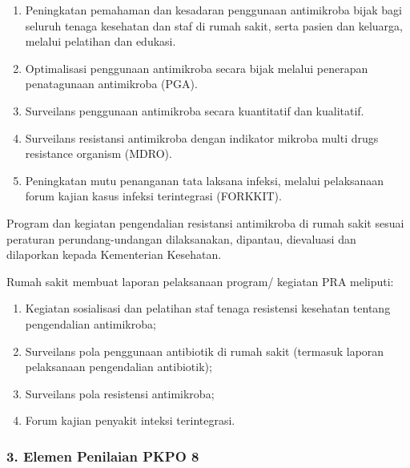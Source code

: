 \documentclass[
]{book}
\providecommand{\tightlist}{%
  \setlength{\itemsep}{0pt}\setlength{\parskip}{0pt}}
\begin{document}
\begin{enumerate}
\def\labelenumi{\alph{enumi}.}
\tightlist
\item
  Peningkatan pemahaman dan kesadaran penggunaan antimikroba bijak bagi seluruh tenaga kesehatan dan staf di rumah sakit, serta pasien dan keluarga, melalui pelatihan dan edukasi.
\item
  Optimalisasi penggunaan antimikroba secara bijak melalui penerapan penatagunaan antimikroba (PGA).
\item
  Surveilans penggunaan antimikroba secara kuantitatif dan kualitatif.
\item
  Surveilans resistansi antimikroba dengan indikator mikroba multi drugs resistance organism (MDRO).
\item
  Peningkatan mutu penanganan tata laksana infeksi, melalui pelaksanaan forum kajian kasus infeksi terintegrasi (FORKKIT).
\end{enumerate}

Program dan kegiatan pengendalian resistansi antimikroba di rumah sakit sesuai peraturan perundang-undangan dilaksanakan, dipantau, dievaluasi dan dilaporkan kepada Kementerian Kesehatan.

Rumah sakit membuat laporan pelaksanaan program/ kegiatan PRA meliputi:

\begin{enumerate}
\def\labelenumi{\alph{enumi}.}
\tightlist
\item
  Kegiatan sosialisasi dan pelatihan staf tenaga resistensi kesehatan tentang pengendalian antimikroba;
\item
  Surveilans pola penggunaan antibiotik di rumah sakit (termasuk laporan pelaksanaan pengendalian antibiotik);
\item
  Surveilans pola resistensi antimikroba;
\item
  Forum kajian penyakit inteksi terintegrasi.
\end{enumerate}

\hypertarget{elemen-penilaian-pkpo-8}{%
\subsubsection*{3. Elemen Penilaian PKPO 8}\label{elemen-penilaian-pkpo-8}}
\end{document}
